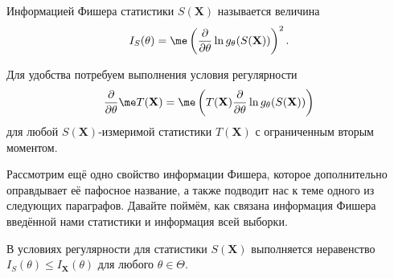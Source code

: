 \begin{definition}
    Информацией Фишера статистики $S(\mathbf X)$ называется величина
    $$I_S(\theta) = \me\left( \frac{\partial}{\partial \theta }\ln{g_{\theta}(S(\mathbf X))}\right)^2.$$
\end{definition}

Для удобства потребуем выполнения условия регулярности $$\frac{\partial}{\partial \theta} \me T(\mathbf X) = \me \left(T(\mathbf X)\frac{\partial}{\partial \theta }\ln{g_{\theta}(S(\mathbf X))}\right)$$
для любой $S(\mathbf X)$-измеримой статистики $T(\mathbf X)$ с ограниченным вторым моментом.

Рассмотрим ещё одно свойство информации Фишера, которое дополнительно оправдывает её пафосное название, а также подводит нас к теме одного из следующих параграфов. Давайте поймём, как связана информация Фишера введённой нами статистики и информация всей выборки.

\begin{theorem}{}{}
    В условиях регулярности для статистики $S(\mathbf X)$ выполняется неравенство $I_{S}(\theta) \le I_{\mathbf X}(\theta)$ для любого $\theta \in \Theta$.
\end{theorem}

